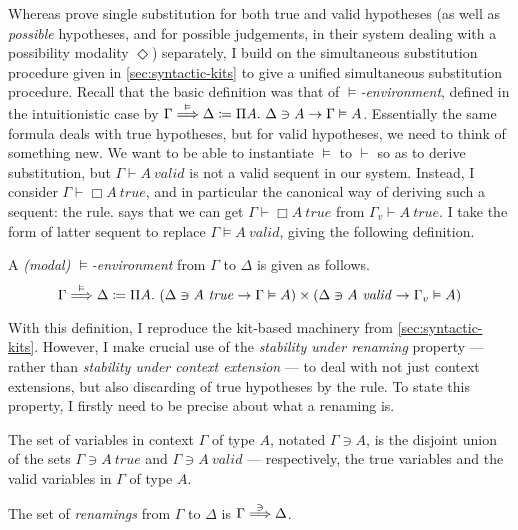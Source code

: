 Whereas \citet{judgmental} prove single substitution for both true and valid
hypotheses (as well as \emph{possible} hypotheses, and for possible judgements,
in their system dealing with a possibility modality $\Diamond$) separately, I
build on the simultaneous substitution procedure given in
\cref{sec:syntactic-kits} to give a unified simultaneous substitution procedure.
Recall that the basic definition was that of \emph{$\vDash$-environment},
defined in the intuitionistic case by
$\Gamma \stackrel{\vDash}\Longrightarrow \Delta \coloneqq \Pi A.~\Delta \ni A \to \Gamma \vDash A$.
Essentially the same formula deals with true hypotheses, but for valid
hypotheses, we need to think of something new.
We want to be able to instantiate $\vDash$ to $\vdash$ so as to derive
substitution, but $\Gamma \vdash A~\mathit{valid}$ is not a valid sequent in our
system.
Instead, I consider $\Gamma \vdash \Box A~\mathit{true}$, and in particular the
canonical way of deriving such a sequent: the  rule.
 says that we can get
$\Gamma \vdash \Box A~\mathit{true}$ from $\Gamma_v \vdash A~\mathit{true}$.
I take the form of latter sequent to replace $\Gamma \vDash A~\mathit{valid}$,
giving the following definition.

\begin{definition}\label{def:PD-env}
  A \emph{(modal) $\vDash$-environment} from $\Gamma$ to $\Delta$ is given as
  follows.
  \[
    \Gamma \env\vDash \Delta \coloneqq
    \Pi A.~\plr{\Delta \ni A~\mathit{true} \to \Gamma \vDash A}
    \times \plr{\Delta \ni A~\mathit{valid} \to \Gamma_v \vDash A}
  \]
\end{definition}

With this definition, I reproduce the kit-based machinery from
\cref{sec:syntactic-kits}.
However, I make crucial use of the \emph{stability under renaming} property ---
rather than \emph{stability under context extension} --- to deal with not just
context extensions, but also discarding of true hypotheses by the
 rule.
To state this property, I firstly need to be precise about what a renaming is.

\begin{definition}\label{def:PD-var}
  The set of variables in context $\Gamma$ of type $A$, notated $\Gamma \ni A$,
  is the disjoint union of the sets $\Gamma \ni A~\mathit{true}$ and
  $\Gamma \ni A~\mathit{valid}$ --- respectively, the true variables and the
  valid variables in $\Gamma$ of type $A$.

  The set of \emph{renamings} from $\Gamma$ to $\Delta$ is
  $\Gamma \stackrel{\ni}\Longrightarrow \Delta$.
\end{definition}

